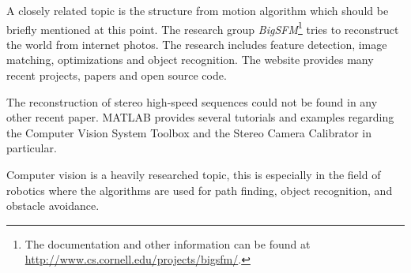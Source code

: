 A closely related topic is the structure from motion algorithm which should be briefly mentioned at this point. The research group \textit{BigSFM}\footnote{The documentation and other information can be found at \url{http://www.cs.cornell.edu/projects/bigsfm/}.} tries to reconstruct the world from internet photos. The research includes feature detection, image matching, optimizations and object recognition. The website provides many recent projects, papers and open source code.

The reconstruction of stereo high-speed sequences could not be found in any other recent paper. MATLAB provides several tutorials and examples regarding the Computer Vision System Toolbox and the Stereo Camera Calibrator in particular.

Computer vision is a heavily researched topic, this is especially in the field of robotics where the algorithms are used for path finding, object recognition, and obstacle avoidance.